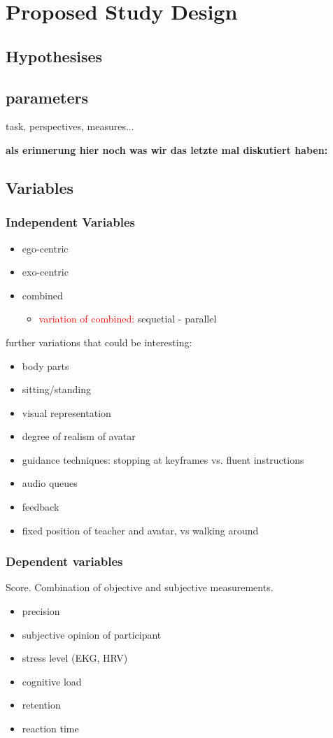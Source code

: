 \chapter{Proposed Study Design}

\section{Hypothesises}

\section{parameters}
task, perspectives, measures...
\begin{comment}

\end{comment}

\textbf{als erinnerung hier noch was wir das letzte mal diskutiert haben:}
\section{Variables}
\subsection{Independent Variables}
\begin{itemize}
	\item ego-centric
	\item exo-centric
	\item combined
	\begin{itemize}
		\item \textcolor{red}{variation of combined:} sequetial - parallel
	\end{itemize}
\end{itemize}
 further variations that could be interesting:
 \begin{itemize}
	\item body parts
	\item sitting/standing
	\item visual representation
	\item degree of realism of avatar
	\item guidance techniques: stopping at keyframes vs. fluent instructions
	\item audio queues
	\item feedback
	\item fixed position of teacher and avatar, vs walking around
\end{itemize}
\subsection{Dependent variables}
Score. Combination of objective and subjective measurements.
\begin{itemize}
	\item precision
	\item subjective opinion of participant
	\item stress level (EKG, HRV)
	\item cognitive load
	\item retention
	\item reaction time
\end{itemize}
